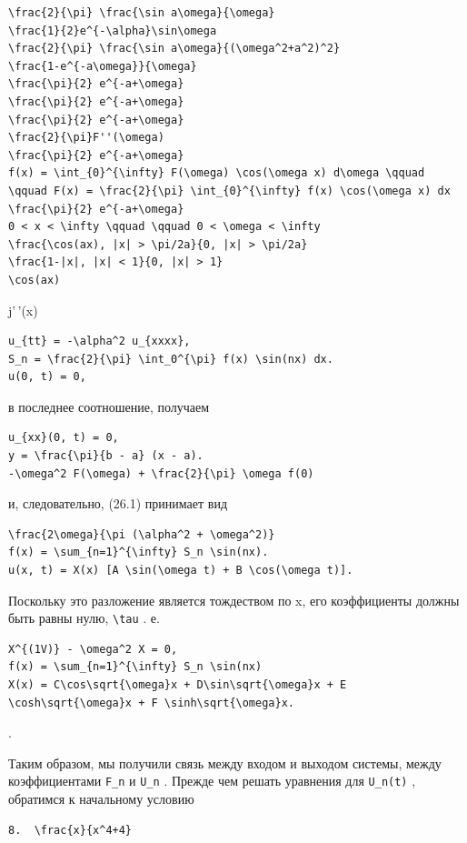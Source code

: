 \documentclass[
  ukrainian,
]{article}
\begin{document}
\begin{verbatim}
\frac{2}{\pi} \frac{\sin a\omega}{\omega}
\frac{1}{2}e^{-\alpha}\sin\omega
\frac{2}{\pi} \frac{\sin a\omega}{(\omega^2+a^2)^2}
\frac{1-e^{-a\omega}}{\omega}
\frac{\pi}{2} e^{-a+\omega}
\frac{\pi}{2} e^{-a+\omega}
\frac{\pi}{2} e^{-a+\omega}
\frac{2}{\pi}F''(\omega)
\frac{\pi}{2} e^{-a+\omega}
f(x) = \int_{0}^{\infty} F(\omega) \cos(\omega x) d\omega \qquad \qquad F(x) = \frac{2}{\pi} \int_{0}^{\infty} f(x) \cos(\omega x) dx
\frac{\pi}{2} e^{-a+\omega}
0 < x < \infty \qquad \qquad 0 < \omega < \infty
\frac{\cos(ax), |x| > \pi/2a}{0, |x| > \pi/2a}
\frac{1-|x|, |x| < 1}{0, |x| > 1}
\cos(ax)
\end{verbatim}

j'\,'(x)

\begin{verbatim}
u_{tt} = -\alpha^2 u_{xxxx},
S_n = \frac{2}{\pi} \int_0^{\pi} f(x) \sin(nx) dx.
u(0, t) = 0,
\end{verbatim}

в последнее соотношение, получаем

\begin{verbatim}
u_{xx}(0, t) = 0,
y = \frac{\pi}{b - a} (x - a).
-\omega^2 F(\omega) + \frac{2}{\pi} \omega f(0)
\end{verbatim}

и, следовательно, (26.1) принимает вид

\begin{verbatim}
\frac{2\omega}{\pi (\alpha^2 + \omega^2)}
f(x) = \sum_{n=1}^{\infty} S_n \sin(nx).
u(x, t) = X(x) [A \sin(\omega t) + B \cos(\omega t)].
\end{verbatim}

Поскольку это разложение является тождеством по x, его коэффициенты
должны быть равны нулю, \texttt{\textbackslash{}tau} . е.

\begin{verbatim}
X^{(1V)} - \omega^2 X = 0,
f(x) = \sum_{n=1}^{\infty} S_n \sin(nx)
X(x) = C\cos\sqrt{\omega}x + D\sin\sqrt{\omega}x + E \cosh\sqrt{\omega}x + F \sinh\sqrt{\omega}x.
\end{verbatim}

.

Таким образом, мы получили связь между входом и выходом системы, между
коэффициентами \texttt{F\_n} и \texttt{U\_n} . Прежде чем решать
уравнения для \texttt{U\_n(t)} , обратимся к начальному условию

\begin{verbatim}
8.  \frac{x}{x^4+4} 
\end{verbatim}
\end{document}
